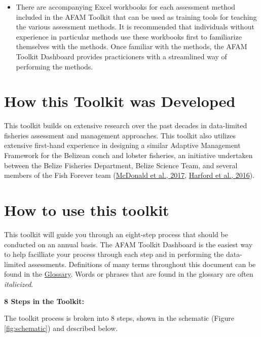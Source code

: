 \documentclass[]{book}
\providecommand{\tightlist}{%
  \setlength{\itemsep}{0pt}\setlength{\parskip}{0pt}}
\begin{document}
\begin{itemize}
\tightlist
\item
  There are accompanying Excel workbooks for each assessment method
  included in the AFAM Toolkit that can be used as training tools for
  teaching the various assessment methods. It is recommended that
  individuals without experience in particular methods use these
  workbooks first to familiarize themselves with the methods. Once
  familiar with the methods, the AFAM Toolkit Dashboard provides
  practicioners with a streamlined way of performing the methods.
\end{itemize}

\section{How this Toolkit was
Developed}\label{how-this-toolkit-was-developed}

This toolkit builds on extensive research over the past decades in
data-limited fisheries assessment and management approaches. This
toolkit also utilizes extensive first-hand experience in designing a
similar Adaptive Management Framework for the Belizean conch and lobster
fisheries, an initiative undertaken between the Belize Fisheries
Department, Belize Science Team, and several members of the Fish Forever
team (\href{http://dx.doi.org/10.1016/j.marpol.2016.11.027}{McDonald et
al., 2017}, \href{http://dx.doi.org/10.5343/bms.2016.1025}{Harford et
al., 2016}).

\section{How to use this toolkit}\label{how-to-use-this-toolkit}

This toolkit will guide you through an eight-step process that should be
conducted on an annual basis. The AFAM Toolkit Dashboard is the easiest
way to help facilliate your process through each step and in performing
the data-limited assessments. Definitions of many terms throughout this
document can be found in the \protect\hyperlink{Glossary}{Glossary}.
Words or phrases that are found in the glossary are often
\emph{italicized}.

\textbf{8 Steps in the Toolkit:}

The toolkit process is broken into 8 steps, shown in the schematic
(Figure \protect\hyperlink{fig:schematic}{\ref{fig:schematic}}) and
described below.
\end{document}
